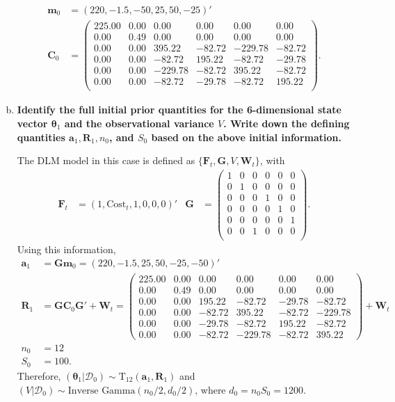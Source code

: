 \documentclass{article}
\newcommand{\sD}{\mathcal{D}}
\newcommand{\bm}{\mathbf{m}}
\newcommand{\bC}{\mathbf{C}}
\newcommand{\btheta}{\boldsymbol{\theta}}
\newcommand{\bF}{\mathbf{F}}
\newcommand{\bG}{\mathbf{G}}
\newcommand{\bW}{\mathbf{W}}
\newcommand{\ba}{\mathbf{a}}
\newcommand{\bR}{\mathbf{R}}
\begin{document}
\begin{enumerate}[(a)]
\begin{align*}
			\bm_0 & = (220,-1.5, -50,  25,  50, -25)' \\
			\bC_0 & = \begin{pmatrix}
			225.00 & 0.00 & 0.00 & 0.00 & 0.00 & 0.00 \\ 
			0.00 & 0.49 & 0.00 & 0.00 & 0.00 & 0.00 \\ 
			0.00 & 0.00 & 395.22 & -82.72 & -229.78 & -82.72 \\ 
			0.00 & 0.00 & -82.72 & 195.22 & -82.72 & -29.78 \\ 
			0.00 & 0.00 & -229.78 & -82.72 & 395.22 & -82.72 \\ 
			0.00 & 0.00 & -82.72 & -29.78 & -82.72 & 195.22 \\ 
			\end{pmatrix}.
		\end{align*}
		
		\item \textbf{Identify the full initial prior quantities for the 6-dimensional state vector $\btheta_1$ and the observational variance $V$. Write down the defining quantities $\ba_1,\bR_1,n_0$, and $S_0$ based on the above initial information.}
		
		The DLM model in this case is defined as $\{ \bF_t, \bG,V,\bW_t \}$, with 
		\begin{align*}
			\bF_t & = (1,\text{Cost}_t,1,0,0,0)' &
			\bG & = \begin{pmatrix}
			1 & 0 & 0 & 0 & 0 & 0 \\
			0 & 1 & 0 & 0 & 0 & 0 \\
			0 & 0 & 0 & 1 & 0 & 0 \\
			0 & 0 & 0 & 0 & 1 & 0 \\
			0 & 0 & 0 & 0 & 0 & 1 \\
			0 & 0 & 1 & 0 & 0 & 0 \\
			\end{pmatrix}.
		\end{align*}
		Using this information,
		\begin{align*}
			\ba_1 & = \bG\bm_0 = (220,  -1.5,  25,  50, -25, -50)' \\
			\bR_1 & = \bG\bC_0\bG' + \bW_t = \begin{pmatrix}
			225.00 & 0.00 & 0.00 & 0.00 & 0.00 & 0.00 \\ 
			0.00 & 0.49 & 0.00 & 0.00 & 0.00 & 0.00 \\ 
			0.00 & 0.00 & 195.22 & -82.72 & -29.78 & -82.72 \\ 
			0.00 & 0.00 & -82.72 & 395.22 & -82.72 & -229.78 \\ 
			0.00 & 0.00 & -29.78 & -82.72 & 195.22 & -82.72 \\ 
			0.00 & 0.00 & -82.72 & -229.78 & -82.72 & 395.22 
			\end{pmatrix}  + \bW_t\\
			n_0 & = 12 \\
			S_0 & = 100.
		\end{align*}
		Therefore, $(\btheta_1|\sD_0) \sim \text{T}_{12}(\ba_1,\bR_1)$ and $(V|\sD_0) \sim \text{Inverse Gamma}(n_0/2,d_0/2)$, where $d_0 = n_0S_0 = 1200$.
		

\end{enumerate}
\end{document}
